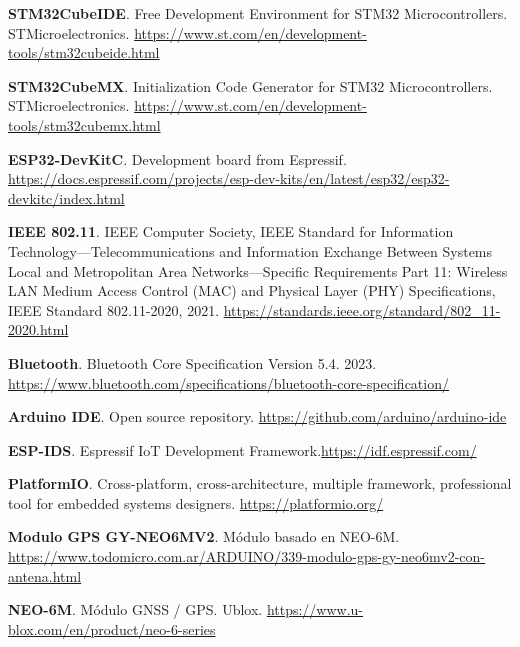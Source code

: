 \begin{thebibliography}{30}
\textbf{STM32CubeIDE}. Free Development Environment for STM32 Microcontrollers. STMicroelectronics.
\href{https://www.st.com/en/development-tools/stm32cubeide.html}{https://www.st.com/en/development-tools/stm32cubeide.html}

\textbf{STM32CubeMX}. Initialization Code Generator for STM32 Microcontrollers. STMicroelectronics.
\href{https://www.st.com/en/development-tools/stm32cubemx.html}{https://www.st.com/en/development-tools/stm32cubemx.html}

\textbf{ESP32-DevKitC}. Development board from Espressif.  \href{https://docs.espressif.com/projects/esp-dev-kits/en/latest/esp32/esp32-devkitc/index.html}{https://docs.espressif.com/projects/esp-dev-kits/en/latest/esp32/esp32-devkitc/index.html} 

\textbf{IEEE 802.11}. IEEE Computer Society, IEEE Standard for Information Technology—Telecommunications and Information Exchange Between Systems Local and Metropolitan Area Networks—Specific Requirements Part 11: Wireless LAN Medium Access Control (MAC) and Physical Layer (PHY) Specifications, IEEE Standard 802.11-2020, 2021. \href{https://standards.ieee.org/standard/802_11-2020.html}{https://standards.ieee.org/standard/802\_11-2020.html}


\textbf{Bluetooth}. Bluetooth Core Specification Version 5.4. 2023. \href{https://www.bluetooth.com/specifications/bluetooth-core-specification/}{https://www.bluetooth.com/specifications/bluetooth-core-specification/}

\textbf{Arduino IDE}. Open source repository.  \href{https://github.com/arduino/arduino-ide}{https://github.com/arduino/arduino-ide}


\textbf{ESP-IDS}. Espressif IoT Development Framework.\href{https://idf.espressif.com/}{https://idf.espressif.com/}

\textbf{PlatformIO}. Cross-platform, cross-architecture, multiple framework, professional tool for embedded systems designers. \href{https://platformio.org/}{https://platformio.org/}


\textbf{Modulo GPS GY-NEO6MV2}. Módulo basado en NEO-6M. \href{https://www.todomicro.com.ar/ARDUINO/339-modulo-gps-gy-neo6mv2-con-antena.html}{https://www.todomicro.com.ar/ARDUINO/339-modulo-gps-gy-neo6mv2-con-antena.html}


\textbf{NEO-6M}. Módulo GNSS / GPS. Ublox. \href{https://www.u-blox.com/en/product/neo-6-series}{https://www.u-blox.com/en/product/neo-6-series}



\end{thebibliography}
